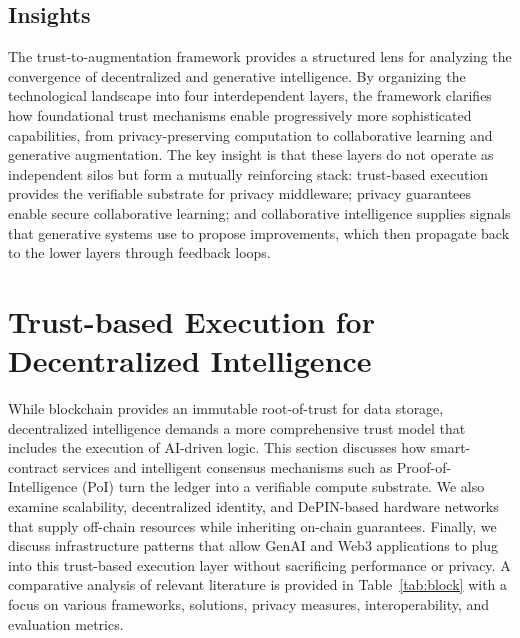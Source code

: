 \documentclass[5p,twocolumn]{elsarticle}
\begin{document}
\subsection{Insights}
The trust-to-augmentation framework provides a structured lens for analyzing the convergence of decentralized and generative intelligence. By organizing the technological landscape into four interdependent layers, the framework clarifies how foundational trust mechanisms enable progressively more sophisticated capabilities, from privacy-preserving computation to collaborative learning and generative augmentation. The key insight is that these layers do not operate as independent silos but form a mutually reinforcing stack: trust-based execution provides the verifiable substrate for privacy middleware; privacy guarantees enable secure collaborative learning; and collaborative intelligence supplies signals that generative systems use to propose improvements, which then propagate back to the lower layers through feedback loops.



\section{Trust-based Execution for Decentralized Intelligence} \label{sec:blockchain}
While blockchain provides an immutable root-of-trust for data storage, decentralized intelligence demands a more comprehensive trust model that includes the execution of AI-driven logic. This section discusses how smart-contract services and intelligent consensus mechanisms such as Proof-of-Intelligence (PoI) turn the ledger into a verifiable compute substrate. We also examine scalability, decentralized identity, and DePIN-based hardware networks that supply off-chain resources while inheriting on-chain guarantees. Finally, we discuss infrastructure patterns that allow GenAI and Web3 applications to plug into this trust-based execution layer without sacrificing performance or privacy. A comparative analysis of relevant literature is provided in Table~\ref{tab:block} with a focus on various frameworks, solutions, privacy measures, interoperability, and evaluation metrics.
\end{document}

